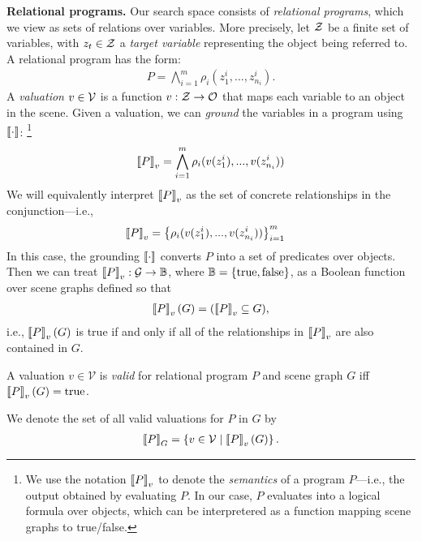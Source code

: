 \textbf{Relational programs.}
%
Our search space consists of \emph{relational programs}, which we view as sets of relations over variables. More precisely, let $\mathcal{Z}$ be a finite set of variables, with $z_{t} \in \mathcal{Z}$ a \emph{target variable} representing the object being referred to. A relational program has the form:
\begin{align*}
P = \bigwedge_{i=1}^m\rho_i(z^i_1,...,z^i_{n_i}).
\end{align*}
A \emph{valuation} $v \in \mathcal{V}$ is a function $v : \mathcal{Z} \to \mathcal{O}$ that maps each variable to an object in the scene. Given a valuation, we can \emph{ground} the variables in a program using $\left\llbracket \cdot \right\rrbracket$:
\footnote{We use the notation $\left\llbracket P \right\rrbracket_v$ to denote the \emph{semantics} of a program $P$---i.e., the output obtained by evaluating $P$. In our case, $P$ evaluates into a logical formula over objects, which can be interpretered as a function mapping scene graphs to true/false.} 
\begin{align*}
\left\llbracket P \right\rrbracket_v=\bigwedge_{i=1}^m\rho_i(v(z^i_1),...,v(z^i_{n_i}))
\end{align*}
We will equivalently interpret $\left\llbracket P \right\rrbracket_v$ as the set of concrete relationships in the conjunction---i.e.,
\begin{align*}
\left\llbracket P \right\rrbracket_v&=\left\{\rho_i(v(z^i_1),...,v(z^i_{n_i}))\right\}_{i=1}^m
\end{align*}
In this case, the grounding $\left\llbracket \cdot \right\rrbracket$ converts $P$ into a set of predicates over objects. Then we can treat $\left\llbracket P \right\rrbracket_v : \mathcal{G} \to \mathbb{B}$, where $\mathbb{B}=\{\text{true},\text{false}\}$, as a Boolean function over scene graphs defined so that
\begin{align*}
\left\llbracket P \right\rrbracket_v(G)=(\left\llbracket P \right\rrbracket_v \subseteq G),
\end{align*}
i.e., $\left\llbracket P \right\rrbracket_v(G)$ is true if and only if all of the relationships in $\left\llbracket P \right\rrbracket_v$ are also contained in $G$.
\begin{definition}
\rm
A valuation $v\in\mathcal{V}$ is \emph{valid} for relational program $P$ and scene graph $G$ iff $\left\llbracket P \right\rrbracket_v(G)=\text{true}$.
\end{definition}
We denote the set of all valid valuations for $P$ in $G$ by
\begin{align*}
\left\llbracket P \right\rrbracket_G = \left\{ v \in \mathcal{V} \mid \left\llbracket P \right\rrbracket_v(G) \right\}.
\end{align*}

